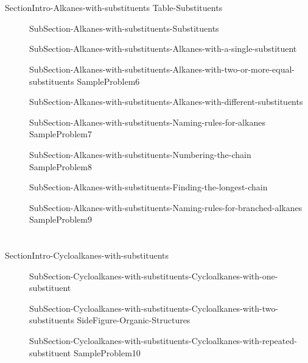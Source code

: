 \documentclass[main.tex]{subfiles}
\begin{document}
 
\section{\color{blue!30!black}{Alkanes with substituents}}
{SectionIntro-Alkanes-with-substituents}
{Table-Substituents}
\sloppy\begin{description}
\item[]{SubSection-Alkanes-with-substituents-Substituents}
\item[]{SubSection-Alkanes-with-substituents-Alkanes-with-a-single-substituent}
\item[]{SubSection-Alkanes-with-substituents-Alkanes-with-two-or-more-equal-substituents}
{SampleProblem6}
\item[]{SubSection-Alkanes-with-substituents-Alkanes-with-different-substituents}
\item[]{SubSection-Alkanes-with-substituents-Naming-rules-for-alkanes}
{SampleProblem7}
\item[]{SubSection-Alkanes-with-substituents-Numbering-the-chain}
{SampleProblem8}
\item[]{SubSection-Alkanes-with-substituents-Finding-the-longest-chain}
\item[]{SubSection-Alkanes-with-substituents-Naming-rules-for-branched-alkanes}
{SampleProblem9}
\end{description}




\section{\color{blue!30!black}{Cycloalkanes with substituents}}
{SectionIntro-Cycloalkanes-with-substituents}
\sloppy
\begin{description}
\item[]{SubSection-Cycloalkanes-with-substituents-Cycloalkanes-with-one-substituent}
\item[] {SubSection-Cycloalkanes-with-substituents-Cycloalkanes-with-two-substituents}
{SideFigure-Organic-Structures}

\item[]{SubSection-Cycloalkanes-with-substituents-Cycloalkanes-with-repeated-substituent}
{SampleProblem10}
\end{description}
\end{document}
